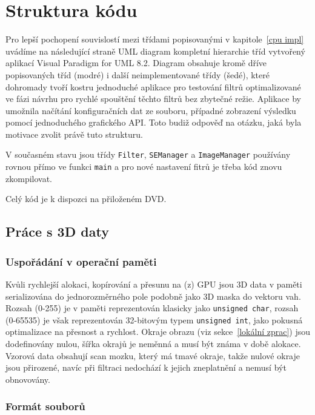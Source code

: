 
\chapter{Struktura kódu}\label{struktura kódu}

    Pro lepší pochopení souvislostí mezi třídami popisovanými v kapitole~\ref{cpu impl} uvádíme na následující straně UML diagram kompletní hierarchie tříd vytvořený aplikací Visual Paradigm for UML 8.2. Diagram obsahuje kromě dříve popisovaných tříd (modré) i další neimplementované třídy (šedé), které dohromady tvoří kostru jednoduché aplikace pro testování filtrů optimalizované ve fázi návrhu pro rychlé spouštění těchto filtrů bez zbytečné režie. Aplikace by umožnila načítání konfiguračních dat ze souboru, případné zobrazení výsledku pomocí jednoduchého grafického API. Toto budiž odpověď na otázku, jaká byla motivace zvolit právě tuto strukturu.

    V současném stavu jsou třídy {\tt Filter}, {\tt SEManager} a {\tt ImageManager} používány rovnou přímo ve funkci {\tt main} a pro nové nastavení fitrů je třeba kód znovu zkompilovat.

    Celý kód je k dispozci na přiloženém DVD.

    \section{Práce s 3D daty}

        \subsection{Uspořádání v operační paměti}

        Kvůli rychlejší alokaci, kopírování a přesunu na (z) GPU jsou 3D data v paměti serializována do jednorozměrného pole podobně jako 3D maska do vektoru vah. Rozsah (0-255) je v paměti reprezentován klasicky jako {\tt unsigned char}, rozsah (0-65535) je však reprezentován 32-bitovým typem {\tt unsigned int}, jako pokusná optimalizace na přesnost a rychlost. Okraje obrazu (viz sekce~\ref{lokální zprac}) jsou dodefinovány nulou, šířka okrajů je neměnná a musí být známa v době alokace. Vzorová data obsahují scan mozku, který má tmavé okraje, takže nulové okraje jsou přirozené, navíc při filtraci nedochází k jejich zneplatnění a nemusí být obnovovány.

        \subsection{Formát souborů}

